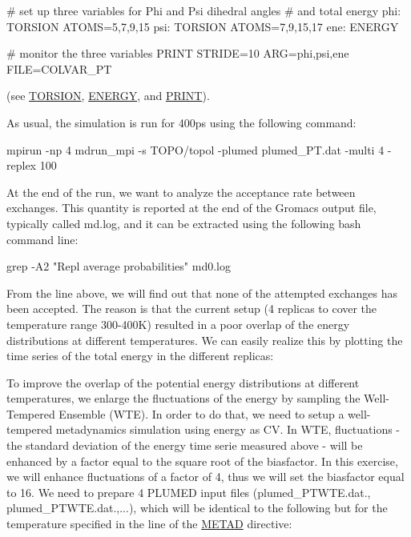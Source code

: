 \begin{DoxyVerb}# set up three variables for Phi and Psi dihedral angles
# and total energy
phi: TORSION ATOMS=5,7,9,15
psi: TORSION ATOMS=7,9,15,17
ene: ENERGY

# monitor the three variables
PRINT STRIDE=10 ARG=phi,psi,ene FILE=COLVAR_PT\end{DoxyVerb}
 (see \hyperlink{TORSION}{T\+O\+R\+S\+I\+O\+N}, \hyperlink{ENERGY}{E\+N\+E\+R\+G\+Y}, and \hyperlink{PRINT}{P\+R\+I\+N\+T}).

As usual, the simulation is run for 400ps using the following command\+:

\begin{DoxyVerb} mpirun -np 4 mdrun_mpi -s TOPO/topol -plumed plumed_PT.dat -multi 4 -replex 100
\end{DoxyVerb}


At the end of the run, we want to analyze the acceptance rate between exchanges. This quantity is reported at the end of the Gromacs output file, typically called md.\+log, and it can be extracted using the following bash command line\+:

\begin{DoxyVerb}grep -A2 "Repl  average probabilities" md0.log
\end{DoxyVerb}


From the line above, we will find out that none of the attempted exchanges has been accepted. The reason is that the current setup (4 replicas to cover the temperature range 300-\/400\+K) resulted in a poor overlap of the energy distributions at different temperatures. We can easily realize this by plotting the time series of the total energy in the different replicas\+:

\label{belfast-7_belfast-7-ptalaw-fig}%
\hypertarget{belfast-7_belfast-7-ptalaw-fig}{}%
 To improve the overlap of the potential energy distributions at different temperatures, we enlarge the fluctuations of the energy by sampling the Well-\/\+Tempered Ensemble (W\+T\+E). In order to do that, we need to setup a well-\/tempered metadynamics simulation using energy as C\+V. In W\+T\+E, fluctuations -\/ the standard deviation of the energy time serie measured above -\/ will be enhanced by a factor equal to the square root of the biasfactor. In this exercise, we will enhance fluctuations of a factor of 4, thus we will set the biasfactor equal to 16. We need to prepare 4 P\+L\+U\+M\+E\+D input files (plumed\+\_\+\+P\+T\+W\+T\+E.\+dat., plumed\+\_\+\+P\+T\+W\+T\+E.\+dat.,...), which will be identical to the following but for the temperature specified in the line of the \hyperlink{METAD}{M\+E\+T\+A\+D} directive\+:

